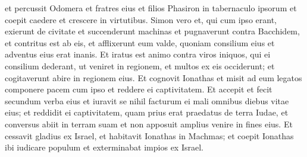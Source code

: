 \begin{biblechapter}
\verse et percussit Odomera et fratres eius et filios Phasiron in tabernaculo ipsorum et coepit caedere et crescere in virtutibus. 
\verse Simon vero et, qui cum ipso erant, exierunt de civitate et succenderunt machinas 
\verse et pugnaverunt contra Bacchidem, et contritus est ab eis, et afflixerunt eum valde, quoniam consilium eius et adventus eius erat inanis. 
\verse Et iratus est animo contra viros iniquos, qui ei consilium dederant, ut veniret in regionem, et multos ex eis occiderunt; et cogitaverunt abire in regionem eius. 
\verse Et cognovit Ionathas et misit ad eum legatos componere pacem cum ipso et reddere ei captivitatem. 
\verse Et accepit et fecit secundum verba eius et iuravit se nihil facturum ei mali omnibus diebus vitae eius; 
\verse et reddidit ei captivitatem, quam prius erat praedatus de terra Iudae, et conversus abiit in terram suam et non apposuit amplius venire in fines eius. 
\verse Et cessavit gladius ex Israel, et habitavit Ionathas in Machmas; et coepit Ionathas ibi iudicare populum et exterminabat impios ex Israel. 
\end{biblechapter}

